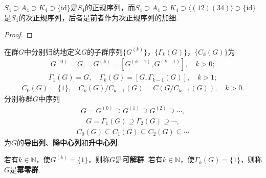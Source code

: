 \documentclass[../../main.tex]{subfiles}%
\begin{document}
\begin{example}
$S_4 \supset A_4 \supset K_4 \supset \{\mathrm{id}\}$是$S_4$的正规序列，而$S_4 \supset A_4 \supset K_4 \supset \langle (12)(34) \rangle \supset \{\mathrm{id}\}$是$S_4$的次正规序列，后者是前者作为次正规序列的加细.
\end{example}
\begin{proof}

\end{proof}

\begin{definition}
在群$G$中分别归纳地定义$G$的子群序列$\{G^{(k)}\}$，$\{\Gamma_k(G)\}$，$\{C_k(G)\}$为
\begin{align*}
G^{(0)} = G,\quad G^{(k)} = [G^{(k-1)}, G^{(k-1)}],\quad k > 0;
\end{align*}
\begin{align*}
\Gamma_1(G) = G,\quad \Gamma_k(G) = [G, \Gamma_{k-1}(G)],\quad k > 1;
\end{align*}
\begin{align*}
C_0(G) = \{1\},\quad C_k(G)/C_{k-1}(G) = C(G/C_{k-1}(G)),\quad k > 0.
\end{align*}
分别称群$G$中序列
\begin{align*}
G = G^{(0)} \supseteq G^{(1)} \supseteq G^{(2)} \supseteq \cdots,
\end{align*}
\begin{align*}
G = \Gamma_1(G) \supseteq \Gamma_2(G) \supseteq \cdots,
\end{align*}
\begin{align*}
C_0(G) \subseteq C_1(G) \subseteq C_2(G) \subseteq \cdots
\end{align*}
为$G$的\textbf{导出列}、\textbf{降中心列}和\textbf{升中心列}.

若有$k\in \mathbb{N}$，使$G^{(k)} = \{1\}$，则称$G$是\textbf{可解群}. 若有$k\in \mathbb{N}$，使$\Gamma_k(G) = \{1\}$，则称$G$是\textbf{幂零群}.
\end{definition}
\end{document}
